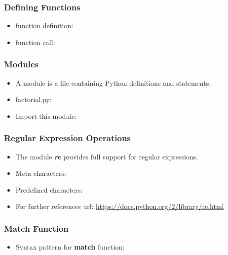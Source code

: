 \documentclass[11pt]{beamer}
\begin{document}
\begin{frame}[plain]
    \frametitle{Defining Functions}
    \begin{itemize}
        \item[] function definition: 
        
        \pause
        \item[] function call:  
        
    \end{itemize}
\end{frame}
\begin{frame}[plain]
    \frametitle{Modules}
    \begin{itemize}
        \item[] A module is a file containing Python definitions and statements. 
        \newline
        \pause
        \item[] factorial.py:
        
        \pause
        \item[] Import this module: 
        
    \end{itemize}
\end{frame}
\begin{frame}[plain]
    \frametitle{Regular Expression Operations}
    \begin{itemize}
        \item[] The module \textbf{\textit{re}} provides full support for regular expressions. 
        \pause
        \item[] Meta characters:
        
        \pause
        \item[] Predefined characters:
        
        \pause
        \item[] For further references url: \url{https://docs.python.org/2/library/re.html} 
    \end{itemize}
\end{frame}
\begin{frame}[plain]
    \frametitle{Match Function}
    \begin{itemize}
        \item[] Syntax pattern for \textbf{match} function:
        \newline
         
        \pause
        
    \end{itemize}
\end{frame}
\end{document}
